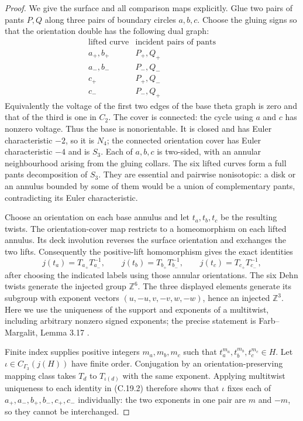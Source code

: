 \documentclass[11pt,oneside]{article}
\begin{document}
\begin{proof}
We give the surface and all comparison maps explicitly. Glue two
pairs of pants $P,Q$ along three pairs of boundary circles
$a,b,c$. Choose the gluing signs so that the orientation double
has the following dual graph:
\[
\begin{array}{c|c}
\text{lifted curve}&\text{incident pairs of pants}\\ \hline
a_+,b_+&P_+,Q_+\\
a_-,b_-&P_-,Q_-\\
c_+&P_+,Q_-\\
c_-&P_-,Q_+
\end{array}
\tag{C.19.1}
\]
Equivalently the voltage of the first two edges of the base
theta graph is zero and that of the third is one in $C_2$.
The cover is connected: the cycle using $a$ and $c$ has nonzero
voltage. Thus the base is nonorientable. It is closed and has
Euler characteristic $-2$, so it is $N_4$; the connected
orientation cover has Euler characteristic $-4$ and is $S_3$.
Each of $a,b,c$ is two-sided, with an annular neighbourhood
arising from the gluing collars. The six lifted curves form a
full pants decomposition of $S_3$. They are essential and
pairwise nonisotopic: a disk or an annulus bounded by some
of them would be a union of complementary pants, contradicting
its Euler characteristic.

Choose an orientation on each base annulus and let
$t_a,t_b,t_c$ be the resulting twists. The orientation-cover map
restricts to a homeomorphism on each lifted annulus. Its deck
involution reverses the surface orientation and exchanges the
two lifts. Consequently the positive-lift homomorphism gives
the exact identities
\[
 j(t_a)=T_{a_+}T_{a_-}^{-1},\qquad
 j(t_b)=T_{b_+}T_{b_-}^{-1},\qquad
 j(t_c)=T_{c_+}T_{c_-}^{-1},
\tag{C.19.2}
\]
after choosing the indicated labels using those annular
orientations. The six Dehn twists generate the injected group
$\mathbb Z^6$. The three displayed elements generate its
subgroup with exponent vectors
$(u,-u,v,-v,w,-w)$, hence an injected $\mathbb Z^3$.
Here we use the uniqueness of the support and exponents of a
multitwist, including arbitrary nonzero signed exponents;
the precise statement is Farb--Margalit, Lemma 3.17
\cite{CextraFarbMargalit}.

Finite index supplies positive integers $m_a,m_b,m_c$ such that
$t_a^{m_a},t_b^{m_b},t_c^{m_c}\in H$.
Let $\iota\in C_{\Gamma_3}(j(H))$ have finite order.
Conjugation by an orientation-preserving mapping class takes
$T_d$ to $T_{\iota(d)}$ with the same exponent.
Applying multitwist uniqueness to each identity in (C.19.2)
therefore shows that $\iota$ fixes each of
$a_+,a_-,b_+,b_-,c_+,c_-$ individually: the two exponents in
one pair are $m$ and $-m$, so they cannot be interchanged.


\end{proof}
\end{document}

